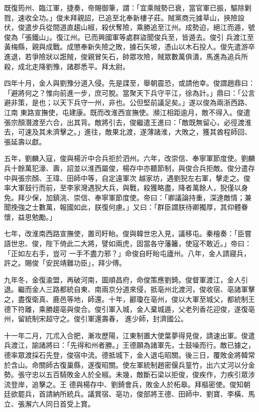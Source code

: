 \begin{pinyinscope}
 既復筠州、臨江軍，捷奏，帝賜御筆，謂：「宜乘賊勢已衰，當官軍已振，驅除剿戮，速收全功。」俊未拜親詔，已追至北奉新樓子莊。賊黨商元據草山，挾險設伏，俊遣步兵從間道直趨山椒，殺伏奪險，乘勝追至江州。成勢迫，絕江而遁，號俊為「張鐵山」。復江州。已而興國軍等處群盜聞俊兵至，皆遁去。俊引
 兵渡江至黃梅縣，親與成戰。成懲奉新失險之敗，據石矢坡，憑山以木石投人。俊先遣游卒進退，若爭險狀以誑賊，俊親冒矢石，帥眾攻險，賊眾數萬俱潰，馬進為追兵所殺，成北走降劉豫，諸郡悉平。拜太尉。



 四年十月，金人與劉豫分道入侵。先是諜至，舉朝震恐，或請他幸。俊謂趙鼎曰：「避將何之？惟向前進一步，庶可脫。當聚天下兵守平江，徐為計。」鼎曰：「公言避非策，是也；以天下兵守一州，非也。公但堅前議足矣。」遂以俊為兩浙西路、江南
 東路宣撫使，屯建康。既而改淮西宣撫使。瀕江相距逾月，敵不得入。俊遣張宗顏潛渡至六合，出其背。敵將引去，俊繼遣王進曰：「敵既無留心，必徑渡淮去，可速及其未濟擊之。」進往，敵果北渡，遂薄諸淮，大敗之，獲其酋程師回、張延壽以獻。



 五年，劉麟入寇，俊與楊沂中合兵拒於泗州。六年，改崇信、奉寧軍節度使。劉麟兵十餘萬犯濠、壽，詔並以淮西屬俊，楊存中亦聽節制，與俊合兵拒敵。俊分遣存中與張宗顏、王瑋、田師中等，自定遠軍次
 越家坊，遇劉猊左右軍，擊走之。俊率大軍鼓行而前，至李家灣遇猊大兵，與戰，殺獲略盡，降者萬餘人，猊僅以身免。拜少保，加鎮洮、崇信、奉寧軍節度使。帝曰：「卿議論持重，深達敵情；兼聞挽強之士數萬，報國如此，朕復何慮。」又曰：「群臣謂朕待卿獨厚，其仰體眷懷，益思勉勵。」



 七年，改淮南西路宣撫使，置司盱眙。俊與韓世忠入見，議移屯。秦檜奏：「臣嘗語世忠、俊，陛下倚此二大將，譬如兩虎，固當各守藩籬，使寇不敢近。」帝曰：「正如左右手，豈可
 一手不盡力邪？」命俊自盱眙屯廬州。八年，金人請寢兵，許之。賜俊「安民靖難功臣」，拜少傅。



 九年冬，金復渝盟，再破河南，圖順昌府，命俊策應劉錡。俊督軍渡江，金人引退。繼而金人三路都統自東、南兩京分道來侵，抵亳州北渡河，俊收宿、亳諸軍擊之，盡復衛真、鹿邑等地，師還。十年，酈瓊在亳州，俊以大軍至城父，都統制王德下符離，乘勝趨亳與俊合。俊引軍入城，金人棄城遁，父老列香花迎俊，遂復亳州，留統制宋超守之。俊引軍還壽春，
 進少師，封濟國公。



 十一年二月，兀朮入合肥，漸攻歷陽，江東制置大使葉夢得見俊，請速出軍。俊遣兵渡江，諭諸將曰：「先得和州者勝。」王德願為諸軍先，士鼓噪而行。敵已據之，德率眾渡採石先登，俊宿中流。德抵城下，金人退屯昭關。後三日，覆敗金將韓常於含山。命關師古復巢縣，遂復昭關。使左軍統制趙密偃兵篁竹，出六丈河以分金勢。張守忠以五百騎敗金人於全椒。未幾，敵斷石梁以拒俊，俊疾作，力疾引眾涉流登岸，追擊之。王
 德與楊存中、劉錡會兵，敗金人於柘皋。拜樞密使。俊知朝廷欲罷兵，首請納所統兵。議賞宿、亳功，俊部將王德、田師中、劉寶、李橫、馬立、張澥六人同日首受上賞。




\end{pinyinscope}
